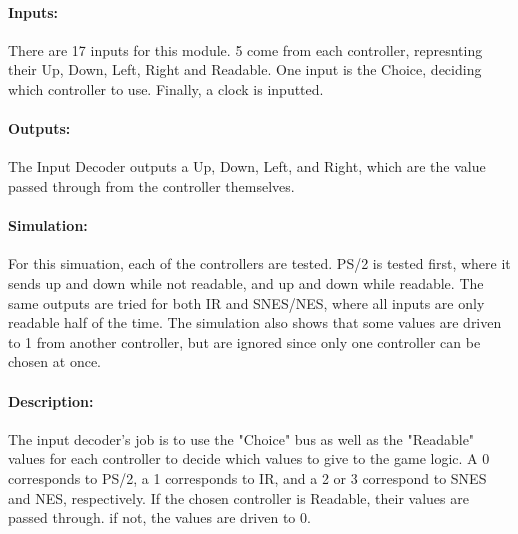 \documentclass[]{article}
\begin{document}
\paragraph{Inputs:} There are 17 inputs for this module. 5 come from each controller, represnting their Up, Down, Left, Right and Readable. One input is the Choice, deciding which controller to use. Finally, a clock is inputted.
\paragraph{Outputs:} The Input Decoder outputs a Up, Down, Left, and Right, which are the value passed through from the controller themselves.
\paragraph{Simulation:} For this simuation, each of the controllers are tested. PS/2 is tested first, where it sends up and down while not readable, and up and down while readable. The same outputs are tried for both IR and SNES/NES, where all inputs are only readable half of the time. The simulation also shows that some values are driven to 1 from another controller, but are ignored since only one controller can be chosen at once.
\paragraph{Description:} The input decoder's job is to use the "Choice" bus as well as the "Readable" values for each controller to decide which values to give to the game logic. A 0 corresponds to PS/2, a 1 corresponds to IR, and a 2 or 3 correspond to SNES and NES, respectively. If the chosen controller is Readable, their values are passed through. if not, the values are driven to 0.
\end{document}
